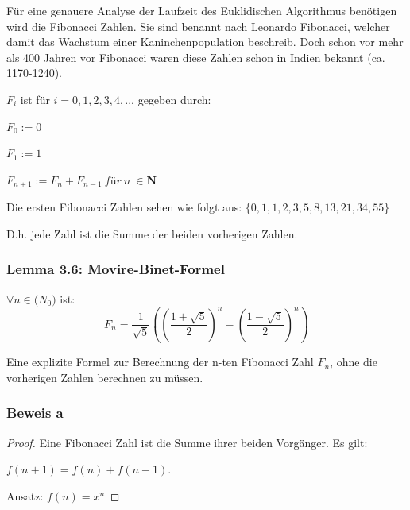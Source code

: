 \documentclass[12pt]{article}
\begin{document}
\begin{algorithm}
Für eine genauere Analyse der Laufzeit des Euklidischen Algorithmus benötigen wird die Fibonacci Zahlen. Sie sind benannt nach Leonardo Fibonacci, welcher damit das Wachstum einer Kaninchenpopulation beschreib. Doch schon vor mehr als 400 Jahren vor Fibonacci waren diese Zahlen schon in Indien bekannt (ca. 1170-1240).

\vspace{0.4cm}

\noindent $F_i$ ist für $i= 0,1,2,3,4,...$ gegeben durch: 

\vspace{0.2cm}

$F_0:= 0$

$F_1:= 1$

$F_{n+1}:= F_n + F_{n-1} \ für \ n \ \in \mathbf{N} $

\vspace{0.2cm}

\noindent Die ersten Fibonacci Zahlen sehen wie folgt aus: $\{0,1,1,2,3,5,8,13,21,34,55\}\ $

\noindent D.h. jede Zahl ist die Summe der beiden vorherigen Zahlen.

\vspace{1cm}

\subsubsection*{Lemma 3.6: Movire-Binet-Formel}

$\forall n \in \mathbf (N_0)$ ist: \[ F_n = \frac{1}{\sqrt{5}} \left( \left(\frac{1+\sqrt{5}}{2}\right)^n - \left(\frac{1-\sqrt{5}}{2}\right)^n \right) \] 


\noindent Eine explizite Formel zur Berechnung der n-ten Fibonacci Zahl $F_n$, ohne die vorherigen Zahlen berechnen zu müssen.

\vspace{1cm}


\subsubsection*{Beweis a}

\begin{proof}
    

Eine Fibonacci Zahl ist die Summe ihrer beiden Vorgänger. Es gilt:

\vspace{0.2cm}
 $f(n+1)= f(n) + f(n-1)$.

 
\vspace{0.3cm}
\noindent Ansatz: $ f(n) = x^n $



\end{proof}
\end{algorithm}
\end{document}

